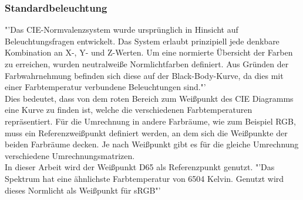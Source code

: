 \documentclass[11pt]{scrartcl}
\begin{document}
\subsubsection{Standardbeleuchtung} \label{whiteRef}
"'Das CIE-Normvalenzsystem wurde ursprünglich in Hinsicht auf Beleuchtungsfragen entwickelt. Das System erlaubt prinzipiell jede denkbare
Kombination an X-, Y- und Z-Werten. Um eine normierte Übersicht der Farben zu erreichen, wurden neutralweiße Normlichtfarben definiert. Aus
Gründen der Farbwahrnehmung befinden sich diese auf der Black-Body-Kurve, da dies mit einer Farbtemperatur verbundene Beleuchtungen sind."'
\cite{wikipediaCIE}\\
Dies bedeutet, dass von dem roten Bereich zum Weißpunkt des CIE Diagramms eine Kurve zu finden ist, welche die verschiedenen
Farbtemperaturen repräsentiert. Für die Umrechnung in andere Farbräume, wie zum Beispiel RGB, muss ein Referenzweißpunkt definiert werden,
an dem sich die Weißpunkte der beiden Farbräume decken. Je nach Weißpunkt gibt es für die gleiche Umrechnung verschiedene
Umrechnungsmatrizen.\\
In dieser Arbeit wird der Weißpunkt D65 als Referenzpunkt genutzt. "'Das Spektrum hat eine ähnlichste Farbtemperatur von 6504 Kelvin.
Genutzt wird dieses Normlicht als Weißpunkt für sRGB"' \cite{wikipediaCIE}
\end{document}
